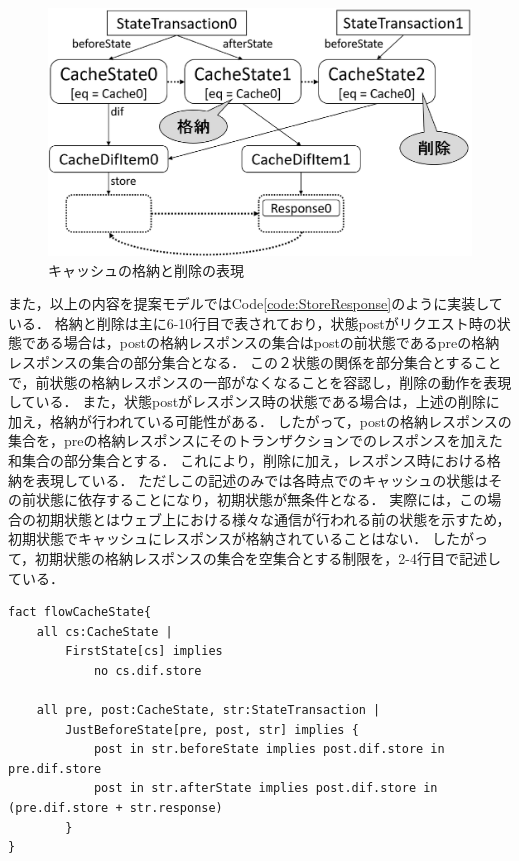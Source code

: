 \documentclass[12pt,a4paper]{jbook}
\begin{document}
\begin{figure}[htb]
\centering
\includegraphics[width=450pt]{./fig/ProposedModel-ResponseStoreDelete.eps}
\caption{キャッシュの格納と削除の表現}
\label{fig:ProposedModel-ResponseStoreDelete}
\end{figure}

また，以上の内容を提案モデルではCode\ref{code:StoreResponse}のように実装している．
格納と削除は主に6-10行目で表されており，状態postがリクエスト時の状態である場合は，postの格納レスポンスの集合はpostの前状態であるpreの格納レスポンスの集合の部分集合となる．
この２状態の関係を部分集合とすることで，前状態の格納レスポンスの一部がなくなることを容認し，削除の動作を表現している．
また，状態postがレスポンス時の状態である場合は，上述の削除に加え，格納が行われている可能性がある．
したがって，postの格納レスポンスの集合を，preの格納レスポンスにそのトランザクションでのレスポンスを加えた和集合の部分集合とする．
これにより，削除に加え，レスポンス時における格納を表現している．
ただしこの記述のみでは各時点でのキャッシュの状態はその前状態に依存することになり，初期状態が無条件となる．
実際には，この場合の初期状態とはウェブ上における様々な通信が行われる前の状態を示すため，初期状態でキャッシュにレスポンスが格納されていることはない．
したがって，初期状態の格納レスポンスの集合を空集合とする制限を，2-4行目で記述している．

\begin{lstlisting}[caption=レスポンスの格納と削除の表現, label=code:StoreResponse]
fact flowCacheState{
	all cs:CacheState |
		FirstState[cs] implies
			no cs.dif.store

	all pre, post:CacheState, str:StateTransaction |
		JustBeforeState[pre, post, str] implies {
			post in str.beforeState implies post.dif.store in pre.dif.store
			post in str.afterState implies post.dif.store in (pre.dif.store + str.response)
		}
}
\end{lstlisting}
\end{document}
